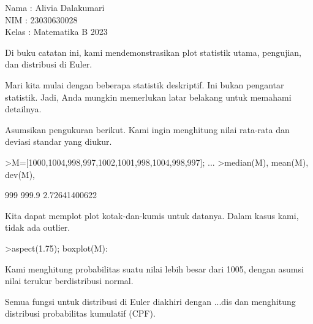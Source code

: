 \documentclass[a4paper,10pt]{article}
\begin{document}
\begin{eulernotebook}
\begin{eulercomment}
Nama  : Alivia Dalakumari\\
NIM   : 23030630028\\
Kelas : Matematika B 2023

\begin{eulercomment}
\begin{eulercomment}
Di buku catatan ini, kami mendemonstrasikan plot statistik utama,
pengujian, dan distribusi di Euler.

Mari kita mulai dengan beberapa statistik deskriptif. Ini bukan
pengantar statistik. Jadi, Anda mungkin memerlukan latar belakang
untuk memahami detailnya.

Asumsikan pengukuran berikut. Kami ingin menghitung nilai rata-rata
dan deviasi standar yang diukur.
\end{eulercomment}
\begin{eulerprompt}
>M=[1000,1004,998,997,1002,1001,998,1004,998,997]; ...
>median(M), mean(M), dev(M),
\end{eulerprompt}
\begin{euleroutput}
  999
  999.9
  2.72641400622
\end{euleroutput}
\begin{eulercomment}
Kita dapat memplot plot kotak-dan-kumis untuk datanya. Dalam kasus
kami, tidak ada outlier.
\end{eulercomment}
\begin{eulerprompt}
>aspect(1.75); boxplot(M):
\end{eulerprompt}
\begin{eulercomment}
Kami menghitung probabilitas suatu nilai lebih besar dari 1005, dengan
asumsi nilai terukur berdistribusi normal.

Semua fungsi untuk distribusi di Euler diakhiri dengan ...dis dan
menghitung distribusi probabilitas kumulatif (CPF).


\end{eulercomment}
\end{eulercomment}
\end{eulercomment}
\end{eulernotebook}
\end{document}
